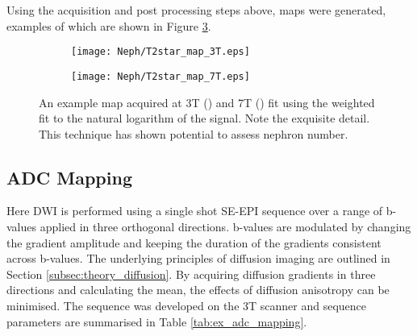Using the acquisition and post processing steps above, \ttwostar maps were generated, examples of which are shown in Figure \ref{fig:ex_t2star_maps}.

\begin{figure}[H]
	\centering
	\begin{subfigure}[c]{0.47\textwidth}
		\centering
		\texttt{[image: Neph/T2star\_map\_3T.eps]}
		\caption{}
		\label{fig:ex_t2star_map_3t}
	\end{subfigure}
	\hfill
	\begin{subfigure}[c]{0.47\textwidth}
		\centering
		\texttt{[image: Neph/T2star\_map\_7T.eps]}
		\caption{}
		\label{fig:ex_t2star_map_7t}
	\end{subfigure}
	\caption{An example \ttwostar map acquired at 3T () and 7T () fit using the weighted fit to the natural logarithm of the signal. Note the exquisite detail. This technique has shown potential to assess nephron number.}
	\label{fig:ex_t2star_maps}
\end{figure}

\subsection{\acl*{ADC} Mapping}
\label{subsec:ex_adc}

Here \ac{DWI} is performed using a single shot \ac{SE}-\ac{EPI} sequence over a range of b-values applied in three orthogonal directions. b-values are modulated by changing the gradient amplitude and keeping the duration of the gradients consistent across b-values. The underlying principles of diffusion imaging are outlined in Section \ref{subsec:theory_diffusion}. By acquiring diffusion gradients in three directions and calculating the mean, the effects of diffusion anisotropy can be minimised. The sequence was developed on the 3T scanner and sequence parameters are summarised in Table \ref{tab:ex_adc_mapping}. 

